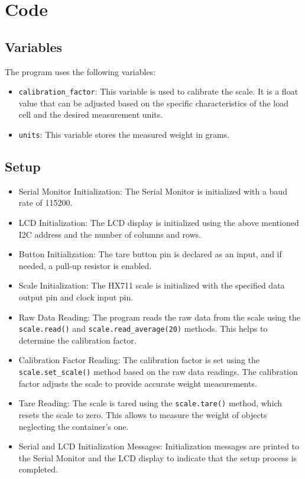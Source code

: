 \section{Code}

\subsection{Variables}
The program uses the following variables:
\begin{itemize}
\item \texttt{calibration\_factor}: This variable is used to calibrate the scale. It is a float value that can be adjusted based on the specific characteristics of the load cell and the desired measurement units.
\item \texttt{units}: This variable stores the measured weight in grams.
\end{itemize}

\subsection{Setup}
\begin{itemize}
\item Serial Monitor Initialization: The Serial Monitor is initialized with a baud rate of 115200.
\item LCD Initialization: The LCD display is initialized using the above mentioned I2C address and the number of columns and rows.
\item Button Initialization: The tare button pin is declared as an input, and if needed, a pull-up resistor is enabled.
\item Scale Initialization: The HX711 scale is initialized with the specified data output pin and clock input pin.
\item Raw Data Reading: The program reads the raw data from the scale using the \texttt{scale.read()} and \texttt{scale.read\_average(20)} methods. This helps to determine the calibration factor.
\item Calibration Factor Reading: The calibration factor is set using the \texttt{scale.set\_scale()} method based on the raw data readings. The calibration factor adjusts the scale to provide accurate weight measurements.
\item Tare Reading: The scale is tared using the \texttt{scale.tare()} method, which resets the scale to zero. This allows to measure the weight of objects neglecting the container's one.
\item Serial and LCD Initialization Messages: Initialization messages are printed to the Serial Monitor and the LCD display to indicate that the setup process is completed.
\end{itemize}

